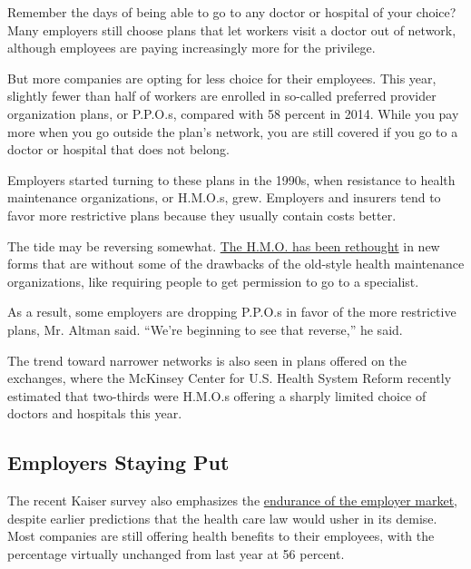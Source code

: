 Remember the days of being able to go to any doctor or hospital of your
choice? Many employers still choose plans that let workers visit a
doctor out of network, although employees are paying increasingly more
for the privilege.

But more companies are opting for less choice for their employees. This
year, slightly fewer than half of workers are enrolled in so-called
preferred provider organization plans, or P.P.O.s, compared with 58
percent in 2014. While you pay more when you go outside the plan's
network, you are still covered if you go to a doctor or hospital that
does not belong.

Employers started turning to these plans in the 1990s, when resistance
to health maintenance organizations, or H.M.O.s, grew. Employers and
insurers tend to favor more restrictive plans because they usually
contain costs better.

The tide may be reversing somewhat.
\href{http://www.nytimes3xbfgragh.onion/2016/02/29/business/trying-to-revive-hmos-but-without-those-scarlet-letters.html}{The
H.M.O. has been rethought} in new forms that are without some of the
drawbacks of the old-style health maintenance organizations, like
requiring people to get permission to go to a specialist.

As a result, some employers are dropping P.P.O.s in favor of the more
restrictive plans, Mr. Altman said. ``We're beginning to see that
reverse,'' he said.

The trend toward narrower networks is also seen in plans offered on the
exchanges, where the McKinsey Center for U.S. Health System Reform
recently estimated that two-thirds were H.M.O.s offering a sharply
limited choice of doctors and hospitals this year.

\hypertarget{employers-staying-put}{%
\subsection{Employers Staying Put}\label{employers-staying-put}}

The recent Kaiser survey also emphasizes the
\href{http://www.nytimes3xbfgragh.onion/2016/04/05/business/employers-keep-health-insurance-despite-affordable-care-act.html}{endurance
of the employer market}, despite earlier predictions that the health
care law would usher in its demise. Most companies are still offering
health benefits to their employees, with the percentage virtually
unchanged from last year at 56 percent.

